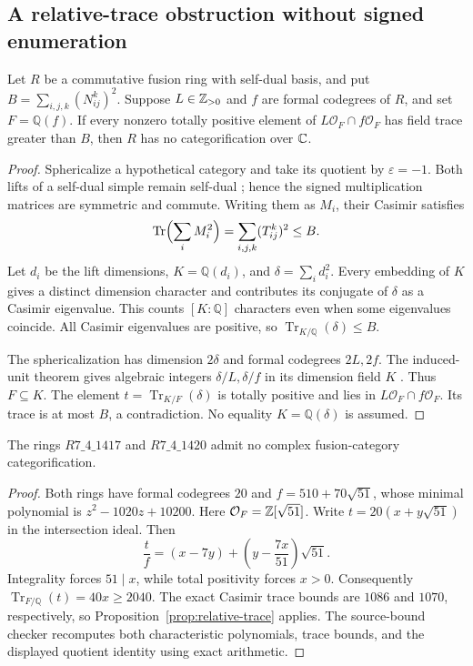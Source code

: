 \subsection{A relative-trace obstruction without signed enumeration}
\begin{proposition}
\label{prop:relative-trace}
Let $R$ be a commutative fusion ring with self-dual basis, and put
$B=\sum_{i,j,k}(N_{ij}^k)^2$. Suppose $L\in\mathbb Z_{>0}$ and $f$ are
formal codegrees of $R$, and set $F=\mathbb Q(f)$.
If every nonzero totally positive element of
$L\mathcal O_F\cap f\mathcal O_F$ has field trace greater than $B$,
then $R$ has no categorification over $\mathbb C$.
\end{proposition}
\begin{proof}
Sphericalize a hypothetical category and take its quotient by
$\varepsilon=-1$. Both lifts of a self-dual simple remain self-dual
\cite[Section~5.1(a)]{OstrikRank3}; hence the signed multiplication
matrices are symmetric and commute. Writing them as $M_i$, their
Casimir satisfies
\[
 \operatorname{Tr}\Bigl(\sum_iM_i^2\Bigr)
 =\sum_{i,j,k}(T_{ij}^k)^2\le B.
\]
Let $d_i$ be the lift dimensions, $K=\mathbb Q(d_i)$, and
$\delta=\sum_i d_i^2$. Every embedding of $K$ gives a distinct
dimension character and contributes its conjugate of $\delta$ as
a Casimir eigenvalue. This counts $[K:\mathbb Q]$ characters even
when some eigenvalues coincide. All Casimir eigenvalues are positive,
so $\operatorname{Tr}_{K/\mathbb Q}(\delta)\le B$.

The sphericalization has dimension $2\delta$ and formal codegrees
$2L,2f$. The induced-unit theorem gives algebraic integers
$\delta/L,\delta/f$ in its dimension field $K$
\cite[Theorem~2.13 and Corollaries~2.14--2.15]{OstrikRank3}.
Thus $F\subseteq K$. The element
$t=\operatorname{Tr}_{K/F}(\delta)$ is totally positive and lies in
$L\mathcal O_F\cap f\mathcal O_F$. Its trace is at most $B$, a
contradiction. No equality $K=\mathbb Q(\delta)$ is assumed.
\end{proof}

\begin{proposition}
The rings $R7\_4\_1417$ and $R7\_4\_1420$ admit no complex
fusion-category categorification.
\end{proposition}
\begin{proof}
Both rings have formal codegrees $20$ and
$f=510+70\sqrt{51}$, whose minimal polynomial is
$z^2-1020z+10200$. Here
$\mathcal O_F=\mathbb Z[\sqrt{51}]$. Write
$t=20(x+y\sqrt{51})$ in the intersection ideal. Then
\[
 \frac{t}{f}=(x-7y)+\left(y-\frac{7x}{51}\right)\sqrt{51}.
\]
Integrality forces $51\mid x$, while total positivity forces $x>0$.
Consequently $\operatorname{Tr}_{F/\mathbb Q}(t)=40x\ge2040$.
The exact Casimir trace bounds are $1086$ and $1070$, respectively,
so Proposition~\ref{prop:relative-trace} applies. The source-bound
checker recomputes both characteristic polynomials, trace bounds,
and the displayed quotient identity using exact arithmetic.
\end{proof}
